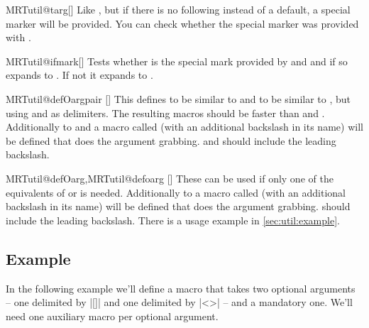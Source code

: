 \begin{describemacro}{MRTutil@targ}[]
  Like , but if there is no  following instead of a
  default, a special marker will be provided. You can check whether the special
  marker was provided with .
\end{describemacro}

\begin{describemacro}{MRTutil@ifmark}[]
  Tests whether  is the special mark provided by 
  and  and if so expands to . If not it expands to
  .
\end{describemacro}

\begin{describemacro}{MRTutil@defOargpair}
  []
  This defines  to be similar to  and  to
  be similar to , but using  and  as
  delimiters. The resulting macros should be faster than  and
  . Additionally to  and  a macro called
   (with an additional backslash in its name) will be
  defined that does the argument grabbing.  and  should
  include the leading backslash.
\end{describemacro}

\begin{describemacro}{MRTutil@defOarg,MRTutil@defoarg}
  []
  These can be used if only one of the equivalents of  or
   is needed. Additionally to  a macro called
   (with an additional backslash in its name) will be
  defined that does the argument grabbing.  should include the leading
  backslash. There is a usage example in \autoref{sec:util:example}.
\end{describemacro}

\subsection{Example}\label{sec:util:example}%
In the following example we'll define a macro that takes two optional arguments
-- one delimited by |[]| and one delimited by |<>| -- and a mandatory one. We'll
need one auxiliary macro per optional argument.

